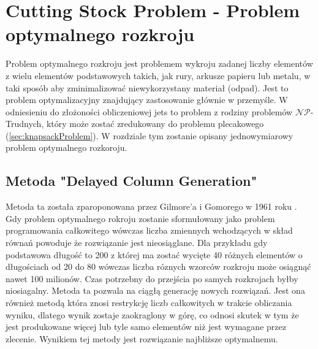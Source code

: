 \section{Cutting Stock Problem - Problem optymalnego rozkroju}
\label{sec:cuttingStockProblem}
\newcommand{\mf}[1]{\textbf{\textit{#1}}}
\newcommand{\tsub}[1]{\textsubscript{#1}}
\newcommand{\tsuper}[1]{\textsuperscript{#1}}

Problem optymalnego rozkroju jest problemem wykroju zadanej liczby elementów z wielu elementów podstawowych takich, jak rury, arkusze papieru lub metalu, w taki sposób aby zminimalizować niewykorzystany materiał (odpad). Jest to problem optymalizacyjny znajdujący zastosowanie głównie w przemyśle.  W odniesieniu do  złożoności obliczeniowej jets to problem z rodziny problemów $\mathcal{NP}$-Trudnych, który może zostać zredukowany do problemu plecakowego (\cref{sec:knapsackProblem}). W rozdziale tym zostanie opisany jednowymiarowy problem optymalnego rozkoroju.

\subsection{Metoda "Delayed Column Generation"}
Metoda ta została zparoponowana przez Gilmore'a i Gomorego w 1961 roku \cite{GilmoreGomoryV1Article}. Gdy problem optymalnego rokroju zostanie sformułowany jako problem programowania całkowitego wówczas liczba zmiennych wchodzących w skład równań powoduje że rozwiązanie jest nieosiąglane. Dla przykładu gdy podstawowa długość to 200 z której ma zostać wycięte 40 różnych elementów o długościach od 20 do 80 wówczas liczba róznych wzorców rozkroju może osiągnąć nawet 100 milionów. Czas potrzebny do przejścia po samych rozkrojach byłby niosiagalny. Metoda ta pozwala na ciągłą generację nowych rozwiązań. Jest ona również metodą która znosi restrykcję liczb całkowitych w trakcie obliczania wyniku, dlatego wynik zostaje zaokraglony w górę, co odnosi skutek w tym że jest produkowane więcej lub tyle samo elementów niż jest wymagane przez zlecenie. Wynikiem tej metody jest rozwiązanie najbliższe optymalnemu.
